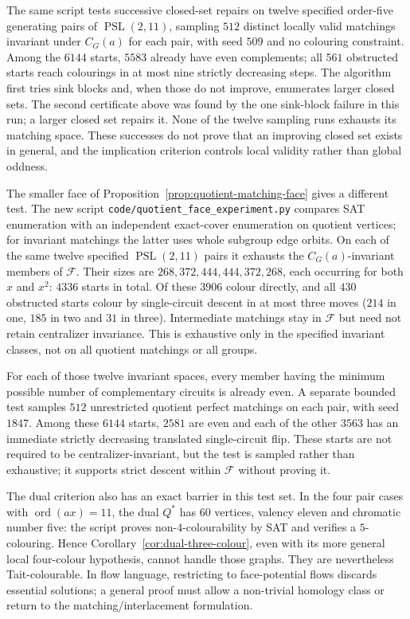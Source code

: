 \documentclass[11pt,a4paper]{article}
\theoremstyle{definition}
\theoremstyle{remark}
\newcommand{\ord}{\operatorname{ord}}
\newcommand{\PSL}{\operatorname{PSL}}
\begin{document}
The same script tests successive closed-set repairs on twelve specified order-five generating pairs of $\PSL(2,11)$, sampling $512$ distinct locally valid matchings invariant under $C_G(a)$ for each pair, with seed $509$ and no colouring constraint.  Among the $6144$ starts, $5583$ already have even complements; all $561$ obstructed starts reach colourings in at most nine strictly decreasing steps.  The algorithm first tries sink blocks and, when those do not improve, enumerates larger closed sets.  The second certificate above was found by the one sink-block failure in this run; a larger closed set repairs it.  None of the twelve sampling runs exhausts its matching space.  These successes do not prove that an improving closed set exists in general, and the implication criterion controls local validity rather than global oddness.

The smaller face of Proposition~\ref{prop:quotient-matching-face} gives a different test.  The new script \nolinkurl{code/quotient_face_experiment.py} compares SAT enumeration with an independent exact-cover enumeration on quotient vertices; for invariant matchings the latter uses whole subgroup edge orbits.  On each of the same twelve specified $\PSL(2,11)$ pairs it exhausts the $C_G(a)$-invariant members of $\mathcal F$.  Their sizes are $268,372,444,444,372,268$, each occurring for both $x$ and $x^2$: $4336$ starts in total.  Of these $3906$ colour directly, and all $430$ obstructed starts colour by single-circuit descent in at most three moves ($214$ in one, $185$ in two and $31$ in three).  Intermediate matchings stay in $\mathcal F$ but need not retain centralizer invariance.  This is exhaustive only in the specified invariant classes, not on all quotient matchings or all groups.

For each of those twelve invariant spaces, every member having the minimum possible number of complementary circuits is already even.  A separate bounded test samples $512$ unrestricted quotient perfect matchings on each pair, with seed $1847$.  Among these $6144$ starts, $2581$ are even and each of the other $3563$ has an immediate strictly decreasing translated single-circuit flip.  These starts are not required to be centralizer-invariant, but the test is sampled rather than exhaustive; it supports strict descent within $\mathcal F$ without proving it.

The dual criterion also has an exact barrier in this test set.  In the four pair cases with $\ord(ax)=11$, the dual $Q^*$ has $60$ vertices, valency eleven and chromatic number five: the script proves non-$4$-colourability by SAT and verifies a $5$-colouring.  Hence Corollary~\ref{cor:dual-three-colour}, even with its more general local four-colour hypothesis, cannot handle those graphs.  They are nevertheless Tait-colourable.  In flow language, restricting to face-potential flows discards essential solutions; a general proof must allow a non-trivial homology class or return to the matching/interlacement formulation.
\end{document}
